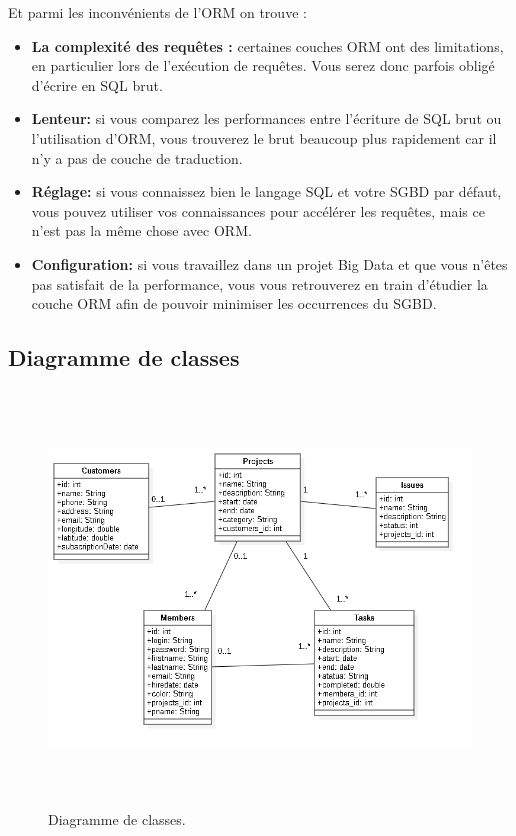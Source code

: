 \bigskip

Et parmi les inconv\'{e}nients de l'ORM on trouve :



\bigskip

\begin{itemize}
\item{\textbf{ La complexit\'{e} des requ\^{e}tes : }certaines couches ORM ont des limitations, en
particulier lors de l'ex\'{e}cution de requ\^{e}tes. Vous serez donc parfois oblig\'{e}
d'\'{e}crire en SQL brut.}

\item{\textbf{Lenteur:}
 si vous comparez les performances entre l'\'{e}criture de SQL brut ou
l'utilisation d'ORM, vous trouverez le brut beaucoup plus rapidement car il
n'y a pas de couche de traduction.}

\item{\textbf{R\'{e}glage:} si vous connaissez bien le langage SQL et votre SGBD par d\'{e}faut,
vous pouvez utiliser vos connaissances pour acc\'{e}l\'{e}rer les requ\^{e}tes, mais ce
n'est pas la m\^{e}me chose avec ORM.}

\item{\textbf{Configuration:}
 si vous travaillez dans un projet Big Data et que vous n'\^{e}tes
pas satisfait de la performance, vous vous retrouverez en train d'\'{e}tudier la
couche ORM afin de pouvoir minimiser les occurrences du SGBD.}



\end{itemize}


\subsection{Diagramme de classes}

\begin{figure}[H]
\center
\includegraphics[width=13cm,height=11cm]{./figures/class.png}
\caption{Diagramme de classes.}

\end{figure}

